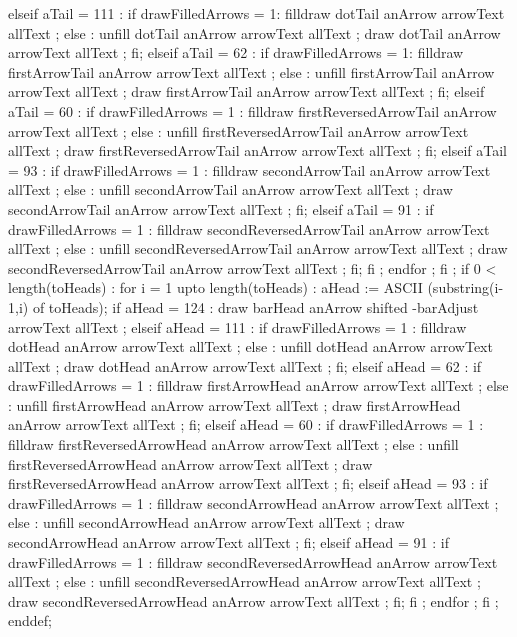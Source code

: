         elseif aTail = 111 : %
          if drawFilledArrows = 1:
            filldraw dotTail anArrow arrowText allText ;
          else :
            unfill dotTail anArrow arrowText allText ;
            draw dotTail anArrow arrowText allText ;
          fi;
        elseif aTail = 62 : %
          if drawFilledArrows = 1:
            filldraw firstArrowTail anArrow arrowText allText ;
          else :
            unfill firstArrowTail anArrow arrowText allText ;
            draw firstArrowTail anArrow arrowText allText ;
          fi;
        elseif aTail = 60 : %
          if drawFilledArrows = 1 :
            filldraw firstReversedArrowTail anArrow arrowText allText ;
          else :
            unfill firstReversedArrowTail anArrow arrowText allText ;
            draw firstReversedArrowTail anArrow arrowText allText ;
          fi;
        elseif aTail = 93 : %
          if drawFilledArrows = 1 :
            filldraw secondArrowTail anArrow arrowText allText ;
          else :
            unfill secondArrowTail anArrow arrowText allText ;
            draw secondArrowTail anArrow arrowText allText ;
          fi;
        elseif aTail = 91 : %
          if drawFilledArrows = 1 :
            filldraw secondReversedArrowTail anArrow arrowText allText ;
          else :
            unfill secondReversedArrowTail anArrow arrowText allText ;
            draw secondReversedArrowTail anArrow arrowText allText ;
          fi;
        fi ;
      endfor ;
    fi ;
    if 0 < length(toHeads) :
      for i = 1 upto length(toHeads) :
        aHead := ASCII (substring(i-1,i) of toHeads);
        if aHead = 124 : %
          draw barHead anArrow
            shifted -barAdjust
            arrowText allText ;
        elseif aHead = 111 : %
          if drawFilledArrows = 1 :
            filldraw dotHead anArrow arrowText allText ;
          else :
            unfill dotHead anArrow arrowText allText ;
            draw dotHead anArrow arrowText allText ;
          fi;
        elseif aHead = 62 : %
          if drawFilledArrows = 1 :
            filldraw firstArrowHead anArrow arrowText allText ;
          else :
            unfill firstArrowHead anArrow arrowText allText ;
            draw firstArrowHead anArrow arrowText allText ;
          fi;
        elseif aHead = 60 : %
          if drawFilledArrows = 1 :
            filldraw firstReversedArrowHead anArrow arrowText allText ;
          else :
            unfill firstReversedArrowHead anArrow arrowText allText ;
            draw firstReversedArrowHead anArrow arrowText allText ;
          fi;
        elseif aHead = 93 : %
          if drawFilledArrows = 1 :
            filldraw secondArrowHead anArrow arrowText allText ;
          else :
            unfill secondArrowHead anArrow arrowText allText ;
            draw secondArrowHead anArrow arrowText allText ;
          fi;
        elseif aHead = 91 : %
          if drawFilledArrows = 1 :
            filldraw secondReversedArrowHead anArrow arrowText allText ;
          else :
            unfill secondReversedArrowHead anArrow arrowText allText ;
            draw secondReversedArrowHead anArrow arrowText allText ;
          fi;
        fi ;
      endfor ;
    fi ;
  enddef;
  
